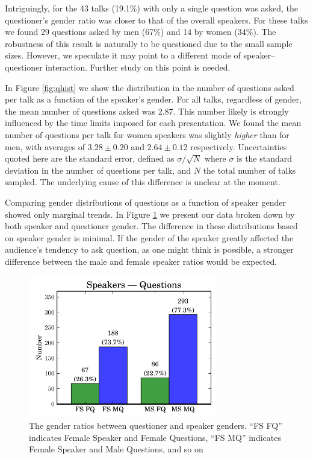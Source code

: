 \documentclass[iop]{emulateapj}
\begin{document}
Intriguingly, for the 43 talks (19.1\%) with only a single question was asked, the questioner's gender ratio was closer to that of the overall speakers. For these talks we found 29 questions asked by men (67\%) and 14 by women (34\%). The robustness of this result is naturally to be questioned due to the small sample sizes. However, we speculate it may point to a different mode of speaker--questioner interaction. Further study on this point is needed.



In Figure \ref{fig:qhist} we show the distribution in the number of questions asked per talk as a function of the speaker's gender. For all talks, regardless of gender, the mean number of questions asked was 2.87. This number likely is strongly influenced by the time limits imposed for each presentation. We found the mean number of questions per talk for women speakers was slightly {\it higher} than for men, with averages of $3.28 \pm 0.20$ and $2.64\pm0.12$ respectively. Uncertainties quoted here are the standard error, defined as $\sigma/\sqrt{N}$ where $\sigma$ is the standard deviation in the number of questions per talk, and $N$ the total number of talks sampled. The underlying cause of this difference is unclear at the moment.


Comparing gender distributions of questions as a function of speaker gender showed only marginal trends. In Figure \ref{fig:sq} we present our data broken down by both speaker and questioner gender. The difference in these distributions based on speaker gender is minimal.  If the gender of the speaker greatly affected the audience's tendency to ask question, as one might think is possible, a stronger difference between the male and female speaker ratios would be expected. 



\begin{figure}[!th]
\centering
\includegraphics[width=3.25in]{speakers_questions}
\caption{The gender ratios between questioner and speaker genders. ``FS FQ'' indicates Female Speaker and Female Questions, ``FS MQ'' indicates Female Speaker and Male Questions, and so on}
\label{fig:sq}
\end{figure}
\end{document}
